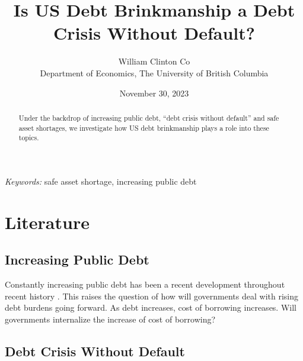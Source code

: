 \documentclass[
  12pt]{article}
\begin{document}
\def\spacingset#1{\renewcommand{\baselinestretch}%
{#1}\small\normalsize} \spacingset{1}



\date{November 30, 2023}
\title{\bf Is US Debt Brinkmanship a Debt Crisis Without Default?}
\author{
William Clinton Co\\
Department of Economics, The University of British Columbia\\
}
\maketitle

\bigskip
\bigskip
\begin{abstract}
Under the backdrop of increasing public debt, ``debt crisis without
default'' and safe asset shortages, we investigate how US debt
brinkmanship plays a role into these topics.
\end{abstract}

\noindent%
{\it Keywords:} safe asset shortage, increasing public debt
\vfill

\newpage
\spacingset{1.9} %
\ifdefined\Shaded\renewenvironment{Shaded}{\begin{tcolorbox}[frame hidden, borderline west={3pt}{0pt}{shadecolor}, enhanced, sharp corners, interior hidden, breakable, boxrule=0pt]}{\end{tcolorbox}}\fi

\hypertarget{sec-l}{%
\section{Literature}\label{sec-l}}

\hypertarget{increasing-public-debt}{%
\subsection{Increasing Public Debt}\label{increasing-public-debt}}

Constantly increasing public debt has been a recent development
throughout recent history \citep{mitchener2023}. This raises the
question of how will governments deal with rising debt burdens going
forward. As debt increases, cost of borrowing increases. Will
governments internalize the increase of cost of borrowing?

\hypertarget{debt-crisis-without-default}{%
\subsection{Debt Crisis Without
Default}\label{debt-crisis-without-default}}
\end{document}
